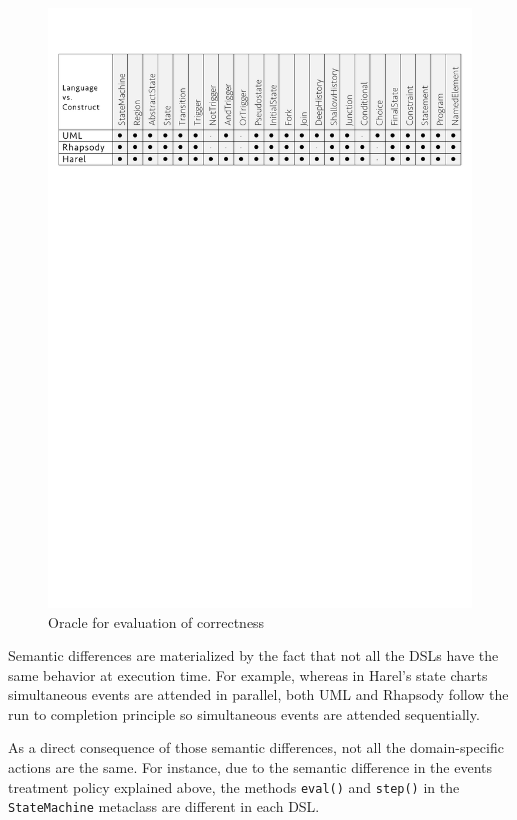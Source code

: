 \begin{figure}
\centering
\includegraphics[width=1\linewidth]{images/oracle.pdf}
\caption{Oracle for evaluation of correctness}
\label{fig:oracle}
\end{figure}

Semantic differences are materialized by the fact that not all the DSLs have the same behavior at execution time. For example, whereas in Harel's state charts simultaneous events are attended in parallel, both UML and Rhapsody follow the run to completion principle so simultaneous events are attended sequentially. 

As a direct consequence of those semantic differences, not all the domain-specific actions are the same. For instance, due to the semantic difference in the events treatment policy explained above, the methods \texttt{eval()} and \texttt{step()} in the \texttt{StateMachine} metaclass are different in each DSL. 

